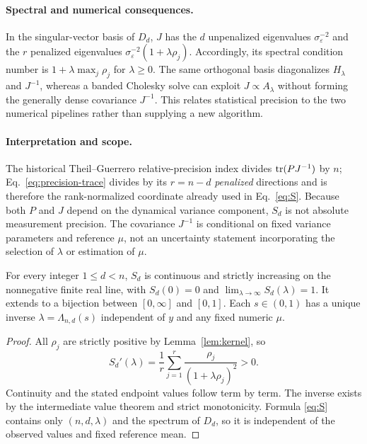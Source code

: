 \paragraph{Spectral and numerical consequences.}
In the singular-vector basis of $D_d$, $J$ has the
$d$ unpenalized eigenvalues $\sigma_\varepsilon^{-2}$
and the $r$ penalized eigenvalues
$\sigma_\varepsilon^{-2}(1+\lambda\rho_j)$.
Accordingly, its spectral condition number is
$1+\lambda\max_j\rho_j$ for $\lambda\ge0$.
The same orthogonal basis diagonalizes $H_\lambda$
and $J^{-1}$, whereas a banded Cholesky solve
can exploit $J\propto A_\lambda$ without
forming the generally dense covariance $J^{-1}$.
This relates statistical precision to the
two numerical pipelines rather than supplying
a new algorithm.

\paragraph{Interpretation and scope.}
The historical Theil--Guerrero relative-precision
index divides $\operatorname{tr}(PJ^{-1})$ by $n$;
Eq.~\eqref{eq:precision-trace} divides by its
$r=n-d$ \emph{penalized} directions and is therefore
the rank-normalized coordinate already used in
Eq.~\eqref{eq:S}. Because both $P$ and $J$
depend on the dynamical variance component,
$S_d$ is not absolute measurement precision.
The covariance $J^{-1}$ is conditional on fixed
variance parameters and reference $\mu$,
not an uncertainty statement incorporating
the selection of $\lambda$ or estimation of $\mu$.


\begin{theorem}\label{thm:bijection}
For every integer $1\le d<n$, $S_d$ is continuous and strictly increasing on the nonnegative finite real line, with $S_d(0)=0$ and $\lim_{\lambda\to\infty}S_d(\lambda)=1$. It extends to a bijection between $[0,\infty]$ and $[0,1]$. Each $s\in(0,1)$ has a unique inverse $\lambda=\Lambda_{n,d}(s)$ independent of $y$ and any fixed numeric $\mu$.
\end{theorem}
\begin{proof}
All $\rho_j$ are strictly positive by Lemma~\ref{lem:kernel}, so
\begin{equation}\label{eq:Sprime}
S_d'(\lambda)=\frac{1}{r}\sum_{j=1}^r
\frac{\rho_j}{(1+\lambda\rho_j)^2}>0.
\end{equation}
Continuity and the stated endpoint values follow term by term. The inverse exists by the intermediate value theorem and strict monotonicity. Formula \eqref{eq:S} contains only $(n,d,\lambda)$ and the spectrum of $D_d$, so it is independent of the observed values and fixed reference mean.
\end{proof}

